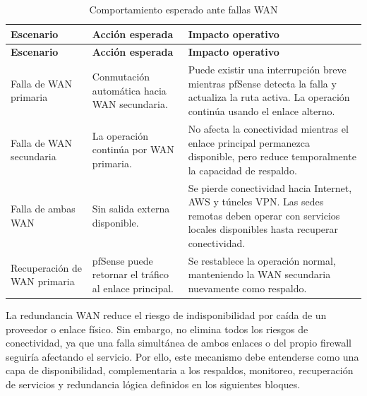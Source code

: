 \documentclass[11pt, a4paper, oneside]{report}
\begin{document}
\begin{xltabular}{\textwidth}{@{}|L{3.2cm}|L{3.2cm}|X|@{}}
\caption{Comportamiento esperado ante fallas WAN}
\label{tab:comportamiento_fallas_wan} \\

\parbox[c][1.1cm][c]{\linewidth}{\centering\color{white}\bfseries\small Escenario} &
\parbox[c][1.1cm][c]{\linewidth}{\centering\color{white}\bfseries\small Acción esperada} &
\parbox[c][1.1cm][c]{\linewidth}{\centering\color{white}\bfseries\small Impacto operativo} \\ \hline
\endfirsthead

\parbox[c][1.1cm][c]{\linewidth}{\centering\color{white}\bfseries\small Escenario} &
\parbox[c][1.1cm][c]{\linewidth}{\centering\color{white}\bfseries\small Acción esperada} &
\parbox[c][1.1cm][c]{\linewidth}{\centering\color{white}\bfseries\small Impacto operativo} \\ \hline
\endhead

\hline
\endfoot

{\small Falla de WAN primaria} &
{\small Conmutación automática hacia WAN secundaria.} &
{\small Puede existir una interrupción breve mientras pfSense detecta la falla y actualiza la ruta activa. La operación continúa usando el enlace alterno.} \\ \hline

{\small Falla de WAN secundaria} &
{\small La operación continúa por WAN primaria.} &
{\small No afecta la conectividad mientras el enlace principal permanezca disponible, pero reduce temporalmente la capacidad de respaldo.} \\ \hline

{\small Falla de ambas WAN} &
{\small Sin salida externa disponible.} &
{\small Se pierde conectividad hacia Internet, AWS y túneles VPN. Las sedes remotas deben operar con servicios locales disponibles hasta recuperar conectividad.} \\ \hline

{\small Recuperación de WAN primaria} &
{\small pfSense puede retornar el tráfico al enlace principal.} &
{\small Se restablece la operación normal, manteniendo la WAN secundaria nuevamente como respaldo.} \\ \hline

\end{xltabular}

\normalsize

La redundancia WAN reduce el riesgo de indisponibilidad por caída de un proveedor o enlace físico. Sin embargo, no elimina todos los riesgos de conectividad, ya que una falla simultánea de ambos enlaces o del propio firewall seguiría afectando el servicio. Por ello, este mecanismo debe entenderse como una capa de disponibilidad, complementaria a los respaldos, monitoreo, recuperación de servicios y redundancia lógica definidos en los siguientes bloques.
\end{document}
